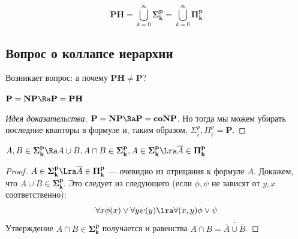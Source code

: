 \begin{definition}
    \[\mathbf{PH} = \bigcup_{k = 0}^\infty \mathbf{\Sigma_k^p} = \bigcup_{k = 0}^\infty \mathbf{\Pi_k^p}\]
\end{definition}

\subsection{Вопрос о коллапсе иерархии}
Возникает вопрос: а почему \(\mathbf{PH} \ne \mathbf{P}\)?

\begin{theorem}
    \(\mathbf{P} = \mathbf{NP} \Ra \mathbf{P} = \mathbf{PH}\)
\end{theorem}
\begin{proof}[Идея доказательства]
    \(\mathbf{P} = \mathbf{NP} \Ra \mathbf{P} = \mathbf{coNP}\). Но тогда мы можем убирать последние кванторы в формуле и, таким образом, \(\Sigma_i^p, \Pi_i^p = \mathbf{P}\).
\end{proof}

\begin{note}
    \(A, B \in \mathbf{\Sigma_k^p} \Ra A \cup B, A \cap B \in \mathbf{\Sigma_k^p}, A \in \mathbf{\Sigma_k^p} \Lra \overline{A} \in \mathbf{\Pi_k^p}\)
\end{note}
\begin{proof}
    \(A \in \mathbf{\Sigma_k^p} \Lra \overline{A} \in \mathbf{\Pi_k^p}\) --- очевидно из отрицания к формуле \(A\). Докажем, что \(A \cup B \in \mathbf{\Sigma_k^p}\). Это следует из следующего (если \(\phi, \psi\) не зависят от \(y, x\) соответственно):
    \[\forall x \phi(x) \vee \forall y \psi(y) \lra \forall (x, y) \phi \vee \psi\]
    Утверждение \(A \cap B \in \mathbf{\Sigma_k^p}\) получается и равенства \(A \cap B = \overline{\overline{A} \cup \overline{B}}\).
\end{proof}

